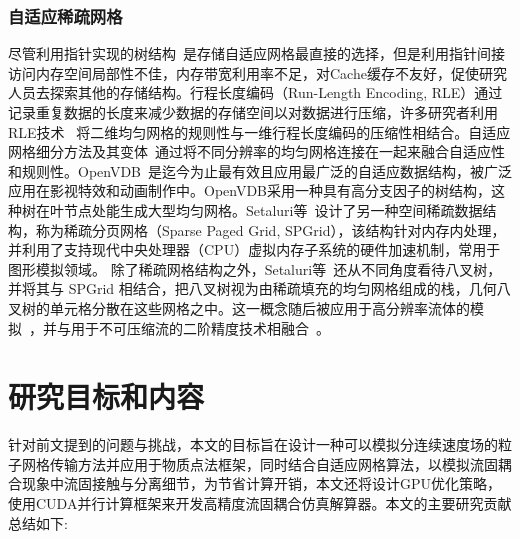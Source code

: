 \subsubsection{自适应稀疏网格}
尽管利用指针实现的树结构~\cite{losasso2004simulating}是存储自适应网格最直接的选择，但是利用指针间接访问内存空间局部性不佳，内存带宽利用率不足，对Cache缓存不友好，促使研究人员去探索其他的存储结构。行程长度编码（Run-Length Encoding, RLE）通过记录重复数据的长度来减少数据的存储空间以对数据进行压缩，许多研究者利用RLE技术~\cite{chentanez2011real, houston2006hierarchical} 将二维均匀网格的规则性与一维行程长度编码的压缩性相结合。自适应网格细分方法及其变体~\cite{cohen2010interactive, english2013chimera}通过将不同分辨率的均匀网格连接在一起来融合自适应性和规则性。OpenVDB~\cite{museth2013vdb}是迄今为止最有效且应用最广泛的自适应数据结构，被广泛应用在影视特效和动画制作中。OpenVDB采用一种具有高分支因子的树结构，这种树在叶节点处能生成大型均匀网格。Setaluri等~\cite{setaluri2014spgrid}设计了另一种空间稀疏数据结构，称为稀疏分页网格（Sparse Paged Grid, SPGrid），该结构针对内存内处理，并利用了支持现代中央处理器（CPU）虚拟内存子系统的硬件加速机制，常用于图形模拟领域。
除了稀疏网格结构之外，Setaluri等~\cite{setaluri2014spgrid}还从不同角度看待八叉树，并将其与 SPGrid 相结合，把八叉树视为由稀疏填充的均匀网格组成的栈，几何八叉树的单元格分散在这些网格之中。这一概念随后被应用于高分辨率流体的模拟~\cite{liu2016scalable}，并与用于不可压缩流的二阶精度技术相融合~\cite{aanjaneya2017power}。

\section{研究目标和内容}
针对前文提到的问题与挑战，本文的目标旨在设计一种可以模拟分连续速度场的粒子网格传输方法并应用于物质点法框架，同时结合自适应网格算法，以模拟流固耦合现象中流固接触与分离细节，为节省计算开销，本文还将设计GPU优化策略，使用CUDA并行计算框架来开发高精度流固耦合仿真解算器。本文的主要研究贡献总结如下:


